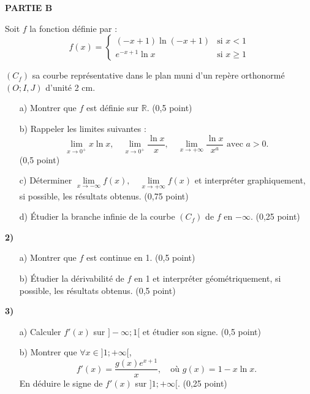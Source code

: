 \documentclass[11pt]{article}
\begin{document}
\vspace{0.4cm}
\noindent
\textbf{PARTIE B}

\noindent
Soit \( f \) la fonction définie par :
\[
f(x) = 
\begin{cases}
(-x + 1)\ln(-x + 1) & \text{si } x < 1 \\
e^{-x+1} \ln x & \text{si } x \geq 1
\end{cases}
\]

\noindent
\( (C_f) \) sa courbe représentative dans le plan muni d’un repère orthonormé \( (O; I, J) \) d’unité 2 cm.

\begin{enumerate}
    \item[a)] Montrer que \( f \) est définie sur \( \mathbb{R} \). \hfill (0,5 point)

    \item[b)] Rappeler les limites suivantes :
    \[
    \lim_{x \to 0^+} x \ln x, \quad \lim_{x \to 0^+} \frac{\ln x}{x}, \quad \lim_{x \to +\infty} \frac{\ln x}{x^a} \text{ avec } a > 0.
    \]
    \hfill (0,5 point)

    \item[c)] Déterminer \( \lim\limits_{x \to -\infty} f(x), \quad \lim\limits_{x \to +\infty} f(x) \) et interpréter graphiquement, si possible, les résultats obtenus. \hfill (0,75 point)

    \item[d)] Étudier la branche infinie de la courbe \( (C_f) \) de \( f \) en \( -\infty \). \hfill (0,25 point)
\end{enumerate}

\vspace{0.3cm}
\noindent
\textbf{2)}

\begin{enumerate}
    \item[a)] Montrer que \( f \) est continue en 1. \hfill (0,5 point)

    \item[b)] Étudier la dérivabilité de \( f \) en 1 et interpréter géométriquement, si possible, les résultats obtenus. \hfill (0,5 point)
\end{enumerate}

\vspace{0.2cm}
\noindent
\textbf{3)}
\begin{enumerate}
    \item[a)] Calculer \( f'(x) \) sur \( ] -\infty ; 1[ \) et étudier son signe. \hfill (0,5 point)
    
    \item[b)] Montrer que \( \forall x \in ]1 ; +\infty[ \),
    \[
    f'(x) = \frac{g(x) e^{x+1}}{x}, \quad \text{où } g(x) = 1 - x \ln x.
    \]
    En déduire le signe de \( f'(x) \) sur \( ]1 ; +\infty[ \). \hfill (0,25 point)
\end{enumerate}
\end{document}
